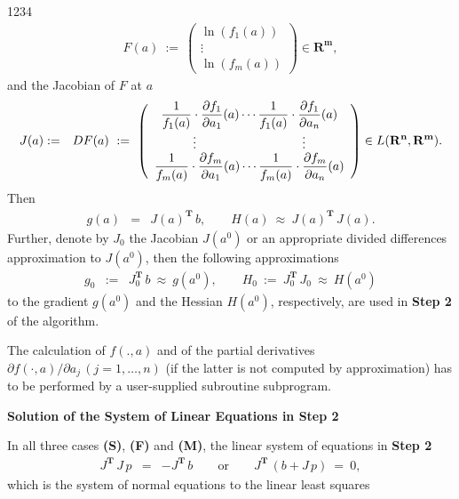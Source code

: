 \begin{DL}{1234}
\begin{eqnarray*}
 F(a) \ := \ \left(\begin{array}{c}
 \ln(f_1(a)) \\ \vdots \\ \ln(f_m(a)) \end{array} \right) \in
 \mathbf{R^m},
\end{eqnarray*}
and the Jacobian of $F$ at $a$
\begin{eqnarray*}
  J(a) & := & DF(a) \ := \ \left(\begin{array}{c} \displaystyle
  \frac{1}{f_1(a)} \cdot \frac{\partial f_1}{\partial a_1}(a) \cdots
  \frac{1}{f_1(a)} \cdot \frac{\partial f_1}{\partial a_n}(a) \\
  \displaystyle \vdots  \hspace{30mm} \vdots \\ \displaystyle
  \frac{1}{f_m(a)} \cdot \frac{\partial f_m}{\partial a_1}(a) \cdots
  \frac{1}{f_m(a)} \cdot \frac{\partial f_m}{\partial a_n}(a)
  \end{array} \right) \in L(\mathbf{R^n},\mathbf{R^m}).
\end{eqnarray*}
Then
\begin{eqnarray*}
 g(a) & = & J(a)^{\mathbf{T}}\,b, \qquad
 H(a) \ \approx \ J(a)^{\mathbf{T}}\,J(a).
\end{eqnarray*}
Further, denote by $J_0$ the Jacobian $J(a^0)$ or an appropriate
divided differences approximation to $J(a^0)$, then the following
approximations
\begin{eqnarray*}
 g_0 & :=& J_0^{\mathbf{T}}\,b \ \approx \ g(a^0), \qquad
 H_0 \ :=\ J_0^{\mathbf{T}}\,J_0 \ \approx \ H(a^0)
\end{eqnarray*}
to the gradient $g(a^0)$ and the Hessian $H(a^0)$, respectively, are
used in {\bf Step 2} of the algorithm.
\par
The calculation of $f(.,a)$ and of the partial derivatives
$\partial f(\cdot,a)/\partial a_j\,(j=1,\ldots ,n)$
(if the latter is not computed by approximation) has to
be performed by a user-supplied subroutine subprogram.
\end{DL}
{\bf Solution of the System of Linear Equations in Step 2}
\par
In all three cases {\bf (S)}, {\bf (F)} and {\bf (M)},
the linear system of equations in {\bf Step 2}
\begin{eqnarray*}
 J^{\mathbf{T}}\,J\,p & = & -J^{\mathbf{T}}\,b
 \qquad \mathrm{or} \qquad J^{\mathbf{T}}\,(b+J\,p) \ = \ 0,
\end{eqnarray*}
which is the system of normal equations to the linear least squares
